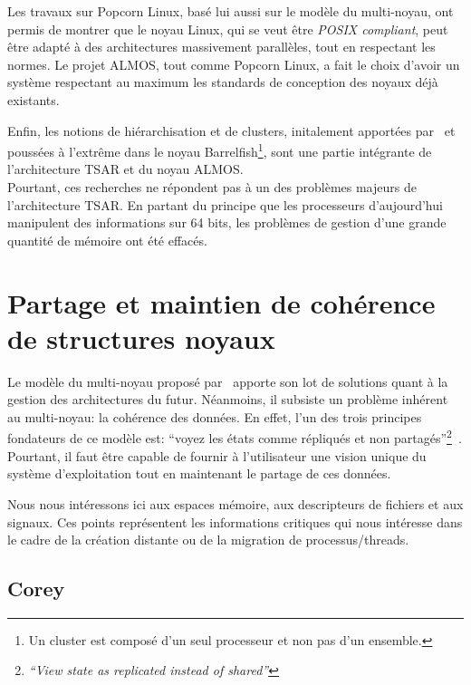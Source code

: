       Les travaux sur Popcorn Linux, basé lui aussi sur le modèle du
      multi-noyau, ont permis de montrer que le noyau Linux, qui se veut être
      \textit{POSIX compliant}, peut être adapté à des architectures massivement
      parallèles, tout en respectant les normes. Le projet ALMOS, tout comme
      Popcorn Linux, a fait le choix d'avoir un système respectant au maximum
      les standards de conception des noyaux déjà existants.

      Enfin, les notions de hiérarchisation et de clusters, initalement
      apportées par~\citet{unrau1995hierarchical} et poussées à l'extrême dans
      le noyau Barrelfish\footnote{Un cluster est composé d'un seul processeur
        et non pas d'un ensemble.}, sont une partie intégrante de l'architecture
      TSAR et du noyau ALMOS.\\

      Pourtant, ces recherches ne répondent pas à un des problèmes majeurs de
      l'architecture TSAR. En partant du principe que les processeurs
      d'aujourd'hui manipulent des informations sur 64 bits, les problèmes de
      gestion d'une grande quantité de mémoire ont été effacés.


  \section{Partage et maintien de cohérence de structures noyaux}
  \label{sec:consistency}

    Le modèle du multi-noyau proposé par~\citeauthor{baumann2009multikernel}
    apporte son lot de solutions quant à la gestion des architectures du
    futur. Néanmoins, il subsiste un problème inhérent au multi-noyau: la
    cohérence des données. En effet, l'un des trois principes fondateurs de ce
    modèle est: ``voyez les états comme répliqués et non
    partagés''\footnote{\textit{``View state as replicated instead of
        shared''}}~\citep{baumann2009multikernel}. Pourtant, il faut être
    capable de fournir à l'utilisateur une vision unique du système
    d'exploitation tout en maintenant le partage de ces données.

    Nous nous intéressons ici aux espaces mémoire, aux descripteurs de fichiers
    et aux signaux. Ces points représentent les informations critiques qui nous
    intéresse dans le cadre de la création distante ou de la migration de
    processus/threads.

    \subsection{Corey}
    \label{subsec:corey}


